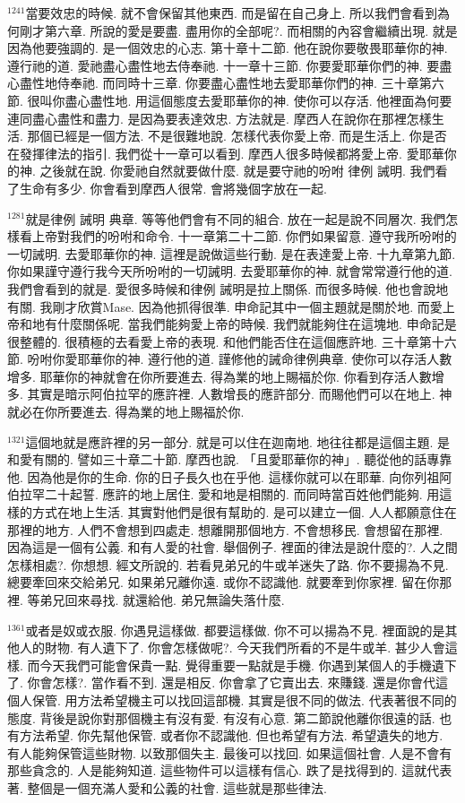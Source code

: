 \documentclass{book}
\begin{document}
$^{1241}$當要效忠的時候.
就不會保留其他東西.
而是留在自己身上.
所以我們會看到為何剛才第六章.
所說的愛是要盡.
盡用你的全部呢?.
而相關的內容會繼續出現.
就是因為他要強調的.
是一個效忠的心志.
第十章十二節.
他在說你要敬畏耶華你的神.
遵行祂的道.
愛祂盡心盡性地去侍奉祂.
十一章十三節.
你要愛耶華你們的神.
要盡心盡性地侍奉祂.
而同時十三章.
你要盡心盡性地去愛耶華你們的神.
三十章第六節.
很叫你盡心盡性地.
用這個態度去愛耶華你的神.
使你可以存活.
他裡面為何要連同盡心盡性和盡力.
是因為要表達效忠.
方法就是.
摩西人在說你在那裡怎樣生活.
那個已經是一個方法.
不是很難地說.
怎樣代表你愛上帝.
而是生活上.
你是否在發揮律法的指引.
我們從十一章可以看到.
摩西人很多時候都將愛上帝.
愛耶華你的神.
之後就在說.
你愛祂自然就要做什麼.
就是要守祂的吩咐 律例 誡明.
我們看了生命有多少.
你會看到摩西人很常.
會將幾個字放在一起.

$^{1281}$就是律例 誡明 典章.
等等他們會有不同的組合.
放在一起是說不同層次.
我們怎樣看上帝對我們的吩咐和命令.
十一章第二十二節.
你們如果留意.
遵守我所吩咐的一切誡明.
去愛耶華你的神.
這裡是說做這些行動.
是在表達愛上帝.
十九章第九節.
你如果謹守遵行我今天所吩咐的一切誡明.
去愛耶華你的神.
就會常常遵行他的道.
我們會看到的就是.
愛很多時候和律例 誡明是拉上關係.
而很多時候.
他也會說地有關.
我剛才欣賞Mase.
因為他抓得很準.
申命記其中一個主題就是關於地.
而愛上帝和地有什麼關係呢.
當我們能夠愛上帝的時候.
我們就能夠住在這塊地.
申命記是很整體的.
很積極的去看愛上帝的表現.
和他們能否住在這個應許地.
三十章第十六節.
吩咐你愛耶華你的神.
遵行他的道.
謹修他的誡命律例典章.
使你可以存活人數增多.
耶華你的神就會在你所要進去.
得為業的地上賜福於你.
你看到存活人數增多.
其實是暗示阿伯拉罕的應許裡.
人數增長的應許部分.
而賜他們可以在地上.
神就必在你所要進去.
得為業的地上賜福於你.

$^{1321}$這個地就是應許裡的另一部分.
就是可以住在迦南地.
地往往都是這個主題.
是和愛有關的.
譬如三十章二十節.
摩西也說.
「且愛耶華你的神」.
聽從他的話專靠他.
因為他是你的生命.
你的日子長久也在乎他.
這樣你就可以在耶華.
向你列祖阿伯拉罕二十起誓.
應許的地上居住.
愛和地是相關的.
而同時當百姓他們能夠.
用這樣的方式在地上生活.
其實對他們是很有幫助的.
是可以建立一個.
人人都願意住在那裡的地方.
人們不會想到四處走.
想離開那個地方.
不會想移民.
會想留在那裡.
因為這是一個有公義.
和有人愛的社會.
舉個例子.
裡面的律法是說什麼的?.
人之間怎樣相處?.
你想想.
經文所說的.
若看見弟兄的牛或羊迷失了路.
你不要揚為不見.
總要牽回來交給弟兄.
如果弟兄離你遠.
或你不認識他.
就要牽到你家裡.
留在你那裡.
等弟兄回來尋找.
就還給他.
弟兄無論失落什麼.

$^{1361}$或者是奴或衣服.
你遇見這樣做.
都要這樣做.
你不可以揚為不見.
裡面說的是其他人的財物.
有人遺下了.
你會怎樣做呢?.
今天我們所看的不是牛或羊.
甚少人會這樣.
而今天我們可能會保貴一點.
覺得重要一點就是手機.
你遇到某個人的手機遺下了.
你會怎樣?.
當作看不到.
還是相反.
你會拿了它賣出去.
來賺錢.
還是你會代這個人保管.
用方法希望機主可以找回這部機.
其實是很不同的做法.
代表著很不同的態度.
背後是說你對那個機主有沒有愛.
有沒有心意.
第二節說他離你很遠的話.
也有方法希望.
你先幫他保管.
或者你不認識他.
但也希望有方法.
希望遺失的地方.
有人能夠保管這些財物.
以致那個失主.
最後可以找回.
如果這個社會.
人是不會有那些貪念的.
人是能夠知道.
這些物件可以這樣有信心.
跌了是找得到的.
這就代表著.
整個是一個充滿人愛和公義的社會.
這些就是那些律法.
\end{document}
